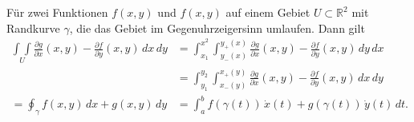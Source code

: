 \begin{satz}[Green]
Für zwei Funktionen $f(x,y)$ und $f(x,y)$ auf einem Gebiet
$U\subset\mathbb{R}^2$ mit Randkurve $\gamma$, die das Gebiet
im Gegenuhrzeigersinn umlaufen.
Dann gilt
\begin{align*}
\underset{U}{\int\!\!\!\int}
\frac{\partial g}{\partial x}(x,y)
-
\frac{\partial f}{\partial y}(x,y)
\,dx\,dy
&=
\int_{x_1}^{x^2}
\int_{y_-(x)}^{y_+(x)}
\frac{\partial g}{\partial x}(x,y)
-
\frac{\partial f}{\partial y}(x,y)
\,dy
\,dx
\\
&=
\int_{y_1}^{y_2}
\int_{x_-(y)}^{x_+(y)}
\frac{\partial g}{\partial x}(x,y)
-
\frac{\partial f}{\partial y}(x,y)
\,dx
\,dy
\\
=
\oint_\gamma f(x,y)\,dx + g(x,y)\,dy
&=
\int_a^b f(\gamma(t))\,\dot{x}(t) + g(\gamma(t))\,\dot{y}(t)\,dt.
\end{align*}
\end{satz}

